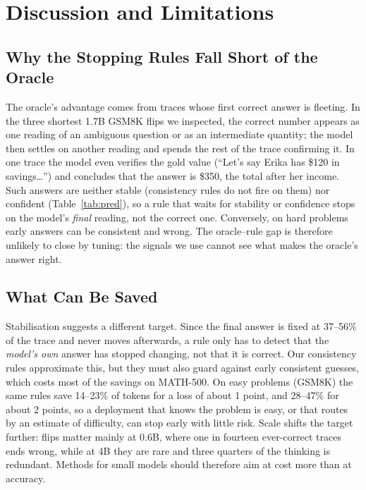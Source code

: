 \documentclass[conference]{IEEEtran}
\begin{document}
\section{Discussion and Limitations}
\label{sec:limits}
\subsection{Why the Stopping Rules Fall Short of the Oracle}
The oracle's advantage comes from traces whose
first correct answer is fleeting. In the three shortest 1.7B GSM8K flips we inspected, the correct number appears as one reading of
an ambiguous question or as an intermediate quantity; the model then settles on another reading and spends the rest of
the trace confirming it. In one trace the model even verifies the gold value (``Let's say Erika has \$120 in
savings\dots'') and concludes that the answer is \$350, the total after her income. Such answers are neither stable
(consistency rules do not fire on them) nor confident (Table~\ref{tab:pred}), so a rule that waits for stability or
confidence stops on the model's \emph{final} reading, not the correct one. Conversely, on hard problems early answers
can be consistent and wrong. The oracle--rule gap is therefore unlikely to close by tuning: the signals we use cannot see what
makes the oracle's answer right.

\subsection{What Can Be Saved}
Stabilisation suggests a different target. Since the final answer is fixed at 37--56\% of
the trace and never moves afterwards, a rule only has to detect that the \emph{model's own} answer has stopped
changing, not that it is correct. Our consistency rules approximate this, but they must also guard against early
consistent guesses, which costs most of the savings on MATH-500. On easy problems (GSM8K) the same rules save 14--23\% of tokens for a
loss of about 1 point, and 28--47\% for about 2 points, so a deployment that knows the problem is easy, or that routes by an estimate
of difficulty, can stop early with little risk. Scale shifts the target further: flips matter mainly at 0.6B, where
one in fourteen ever-correct traces ends wrong, while at 4B they are rare and three quarters of the thinking is
redundant. Methods for small models should therefore aim at cost more than at accuracy.
\end{document}

